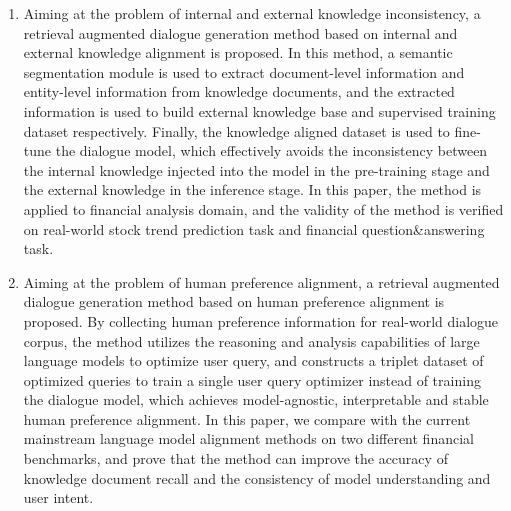 \begin{enumerate}[topsep = 0 pt, itemsep= 0 pt, parsep=0pt, partopsep=0pt, leftmargin=0pt, itemindent=44pt, labelsep=6pt, listparindent=24pt, label=\arabic*)]
	\item Aiming at the problem of internal and external knowledge inconsistency, a retrieval augmented dialogue generation method based on internal and external knowledge alignment is proposed. In this method, a semantic segmentation module is used to extract document-level information and entity-level information from knowledge documents, and the extracted information is used to build external knowledge base and supervised training dataset respectively. Finally, the knowledge aligned dataset is used to fine-tune the dialogue model, which effectively avoids the inconsistency between the internal knowledge injected into the model in the pre-training stage and the external knowledge in the inference stage. In this paper, the method is applied to financial analysis domain, and the validity of the method is verified on real-world stock trend prediction task and financial question\&answering task.

	\item Aiming at the problem of human preference alignment, a retrieval augmented dialogue generation method based on human preference alignment is proposed. By collecting human preference information for real-world dialogue corpus, the method utilizes the reasoning and analysis capabilities of large language models to optimize user query, and constructs a triplet dataset of optimized queries to train a single user query optimizer instead of training the dialogue model, which achieves model-agnostic, interpretable and stable human preference alignment. In this paper, we compare with the current mainstream language model alignment methods on two different financial benchmarks, and prove that the method can improve the accuracy of knowledge document recall and the consistency of model understanding and user intent.
\end{enumerate}

